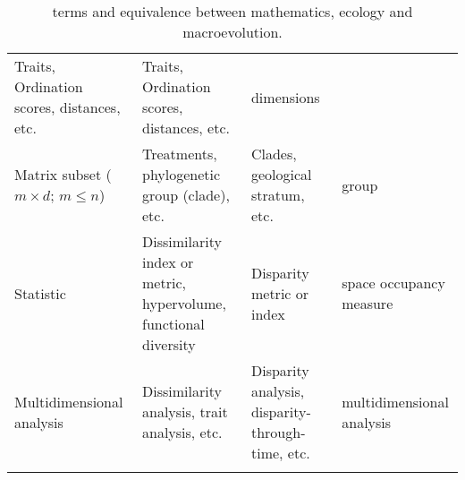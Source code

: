 \documentclass[]{article}
\begin{document}
\begin{longtable}[]{@{}llll@{}}
\begin{minipage}[t]{0.24\columnwidth}
Traits, Ordination scores, distances, etc.\strut
\end{minipage} & \begin{minipage}[t]{0.24\columnwidth}\raggedright\strut
Traits, Ordination scores, distances, etc.\strut
\end{minipage} & \begin{minipage}[t]{0.15\columnwidth}\raggedright\strut
dimensions\strut
\end{minipage}\tabularnewline
\begin{minipage}[t]{0.24\columnwidth}\raggedright\strut
Matrix subset (\(m \times d\); \(m \leq n\))\strut
\end{minipage} & \begin{minipage}[t]{0.24\columnwidth}\raggedright\strut
Treatments, phylogenetic group (clade), etc.\strut
\end{minipage} & \begin{minipage}[t]{0.24\columnwidth}\raggedright\strut
Clades, geological stratum, etc.\strut
\end{minipage} & \begin{minipage}[t]{0.15\columnwidth}\raggedright\strut
group\strut
\end{minipage}\tabularnewline
\begin{minipage}[t]{0.24\columnwidth}\raggedright\strut
Statistic\strut
\end{minipage} & \begin{minipage}[t]{0.24\columnwidth}\raggedright\strut
Dissimilarity index or metric, hypervolume, functional diversity\strut
\end{minipage} & \begin{minipage}[t]{0.24\columnwidth}\raggedright\strut
Disparity metric or index\strut
\end{minipage} & \begin{minipage}[t]{0.15\columnwidth}\raggedright\strut
space occupancy measure\strut
\end{minipage}\tabularnewline
\begin{minipage}[t]{0.24\columnwidth}\raggedright\strut
Multidimensional analysis\strut
\end{minipage} & \begin{minipage}[t]{0.24\columnwidth}\raggedright\strut
Dissimilarity analysis, trait analysis, etc.\strut
\end{minipage} & \begin{minipage}[t]{0.24\columnwidth}\raggedright\strut
Disparity analysis, disparity-through-time, etc.\strut
\end{minipage} & \begin{minipage}[t]{0.15\columnwidth}\raggedright\strut
multidimensional analysis\strut
\end{minipage}\tabularnewline
\bottomrule
\caption{terms and equivalence between mathematics, ecology and
macroevolution.}
\end{longtable}
\end{document}
